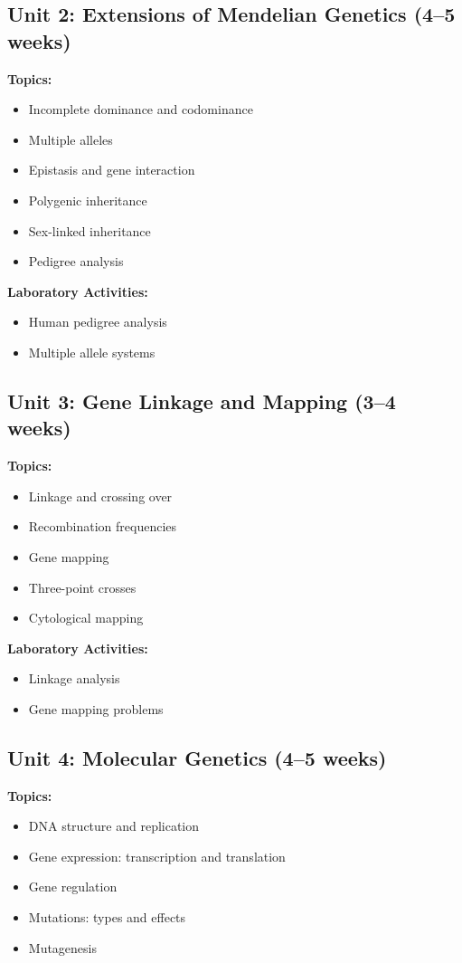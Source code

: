 \documentclass[12pt,oneside]{book}
\begin{document}
\subsection{Unit 2: Extensions of Mendelian Genetics (4--5 weeks)}

\textbf{Topics:}
\begin{itemize}
    \item Incomplete dominance and codominance
    \item Multiple alleles
    \item Epistasis and gene interaction
    \item Polygenic inheritance
    \item Sex-linked inheritance
    \item Pedigree analysis
\end{itemize}

\textbf{Laboratory Activities:}
\begin{itemize}
    \item Human pedigree analysis
    \item Multiple allele systems
\end{itemize}

\subsection{Unit 3: Gene Linkage and Mapping (3--4 weeks)}

\textbf{Topics:}
\begin{itemize}
    \item Linkage and crossing over
    \item Recombination frequencies
    \item Gene mapping
    \item Three-point crosses
    \item Cytological mapping
\end{itemize}

\textbf{Laboratory Activities:}
\begin{itemize}
    \item Linkage analysis
    \item Gene mapping problems
\end{itemize}

\subsection{Unit 4: Molecular Genetics (4--5 weeks)}

\textbf{Topics:}
\begin{itemize}
    \item DNA structure and replication
    \item Gene expression: transcription and translation
    \item Gene regulation
    \item Mutations: types and effects
    \item Mutagenesis
\end{itemize}
\end{document}
